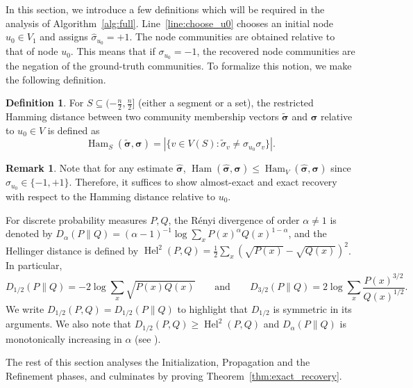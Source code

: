 \documentclass[letterpaper,11pt]{article}
\theoremstyle{definition}
\newtheorem{defn}{Definition}[section]
\newtheorem{rem}{Remark}[section]
\newcommand{\hsigma}{\hat{\sigma}}
\newcommand{\tsigma}{\tilde{\sigma}}
\newcommand{\bsigma}{\bm{\sigma}}
\newcommand{\hbsigma}{\hat{\bsigma}}
\newcommand{\tbsigma}{\tilde{\bsigma}}
\def\torus{(-\frac{n}{2}, \frac{n}{2}]}
\newcommand{\Renyi}{R{\'e}nyi\xspace}
\numberwithin{equation}{section}
\newcommand{\Hel}{\operatorname{Hel}}
\newcommand{\al}{\alpha}
\newcommand{\eps}{\epsilon}
\newcommand{\ka}{\kappa}
\newcommand{\la}{\lambda}
\newcommand{\Ham}{\operatorname{Ham}}
\theoremstyle{definition}
\newtheorem{defn}{Definition}[section]
\newtheorem{rem}{Remark}[section]
\newcommand{\hsigma}{\hat{\sigma}}
\newcommand{\tsigma}{\tilde{\sigma}}
\newcommand{\bsigma}{\bm{\sigma}}
\newcommand{\hbsigma}{\hat{\bsigma}}
\newcommand{\tbsigma}{\tilde{\bsigma}}
\def\torus{(-\frac{n}{2}, \frac{n}{2}]}
\newcommand{\Renyi}{R{\'e}nyi\xspace}
\numberwithin{equation}{section}
\newcommand{\Hel}{\operatorname{Hel}}
\newcommand{\al}{\alpha}
\newcommand{\eps}{\epsilon}
\newcommand{\ka}{\kappa}
\newcommand{\la}{\lambda}
\newcommand{\Ham}{\operatorname{Ham}}
\theoremstyle{thmstyletwo}%
\begin{document}
In this section, we introduce a few definitions which will be required in the analysis of Algorithm~\ref{alg:full}.
Line~\ref{line:choose_u0}  chooses an initial node $u_0 \in V_1$ and assigns $\hsigma_{u_0} = +1$. The node communities are obtained relative to that of node $u_0$. This means that if $\sigma_{u_0} = -1$, the recovered node communities are the negation of the ground-truth communities. To formalize this notion, we make the following definition.
\begin{defn}
For $S \subseteq \torus$ (either a segment or a set),
the restricted Hamming distance between two community membership vectors $\tbsigma$ and $\bsigma$ relative to $u_0 \in V$ is defined as 
\[
 \Ham_{S}(\tbsigma,\bsigma)
 = |\{v\in V(S) \colon \tsigma_v \ne \sigma_{u_0} \sigma_v\}|.
\]
\end{defn}
\begin{rem}
Note that for any estimate $\hbsigma$, $\Ham(\hbsigma,\bsigma) \le \Ham_V(\hbsigma,\bsigma)$ since $\sigma_{u_0} \in \{-1,+1\}$. Therefore, it suffices to show almost-exact and exact recovery with respect to the Hamming distance relative to $u_0$.
\label{rem:Hamming_dist_relation}
\end{rem}

For discrete probability measures $P,Q$,
the \Renyi divergence of order $\al \ne 1$
is denoted by
$D_\al(P\|Q) = (\alpha - 1)^{-1} \log \sum_x P(x)^\al Q(x)^{1-\al}$,
and the Hellinger distance is defined by
$\Hel^2(P,Q) = \frac{1}{2}\sum_x (\sqrt{P(x)}-\sqrt{Q(x)})^2$.
In particular,
\begin{equation}
 D_{1/2}(P\|Q) = -2\log \sum_x \sqrt{P(x)Q(x)}
 \qquad \text{and} \qquad 
 D_{3/2}(P\|Q)
 = 2\log \sum_x \frac{P(x)^{3/2}}{Q(x)^{1/2}}.
 \label{eq:renyi_div_eval}
\end{equation}
We write $D_{1/2}(P,Q) = D_{1/2}(P \| Q)$ to highlight that
$D_{1/2}$ is symmetric in its arguments. 
We also note that
$D_{1/2}(P,Q) \ge \Hel^2(P,Q)$ and $D_\alpha(P\|Q)$ is monotonically increasing in $\alpha$ (see \cite{van2014renyi}).

The rest of this section analyses the Initialization, Propagation and the Refinement phases, and culminates by proving Theorem~\ref{thm:exact_recovery}.
\end{document}
